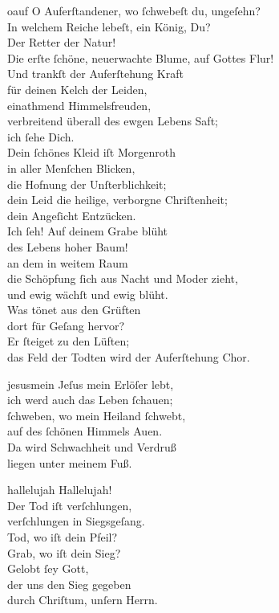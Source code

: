 \documentclass[tocstyle=ref-genre]{ees}
\begin{document}
{\begin{movement}{oauf}
  \voice[Soprano {[I]}]
  O Auferſtandener, wo ſchwebeſt du, ungeſehn?\\
  In welchem Reiche lebeſt, ein König, Du?\\
  Der Retter der Natur!\\
  Die erſte ſchöne, neuerwachte Blume, auf Gottes Flur!\\
  Und trankſt der Auferſtehung Kraft\\
  für deinen Kelch der Leiden,\\
  einathmend Himmelsfreuden,\\
  verbreitend überall des ewgen Lebens Saft;\\
  ich ſehe Dich.\\
  Dein ſchönes Kleid iſt Morgenroth\\
  in aller Menſchen Blicken,\\
  die Hofnung der Unſterblichkeit;\\
  dein Leid die heilige, verborgne Chriſtenheit;\\
  dein Angeſicht Entzücken.\\
  Ich ſeh! Auf deinem Grabe blüht\\
  des Lebens hoher Baum!\\
  an dem in weitem Raum\\
  die Schöpfung ſich aus Nacht und Moder zieht,\\
  und ewig wächſt und ewig blüht.\\
  Was tönet aus den Grüften\\
  dort für Geſang hervor?\\
  Er ſteiget zu den Lüften;\\
  das Feld der Todten wird der Auferſtehung Chor.
\end{movement}

\begin{movement}{jesusmein}
  \voice[Coro]
  Jeſus mein Erlöſer lebt,\\
  ich werd auch das Leben ſchauen;\\
  ſchweben, wo mein Heiland ſchwebt,\\
  auf des ſchönen Himmels Auen.\\
  Da wird Schwachheit und Verdruß\\
  liegen unter meinem Fuß.
\end{movement}

\begin{movement}{hallelujah}
  \voice[Coro I, II]
  Hallelujah!\\
  Der Tod iſt verſchlungen,\\
  verſchlungen in Siegsgeſang.\\
  Tod, wo iſt dein Pfeil?\\
  Grab, wo iſt dein Sieg?\\
  Gelobt ſey Gott,\\
  der uns den Sieg gegeben\\
  durch Chriſtum, unſern Herrn.
\end{movement}
}

\eesScore
\end{document}

